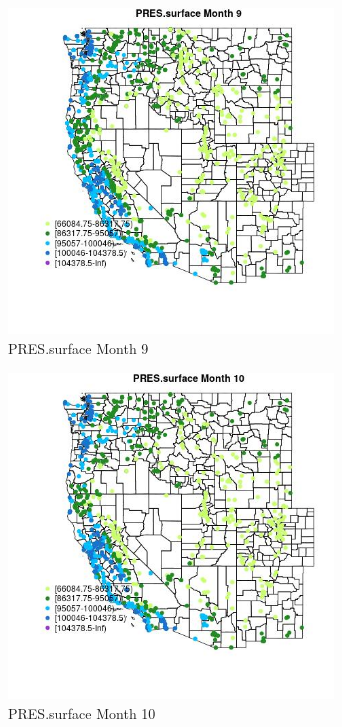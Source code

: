 \begin{figure} 
\centering  
\includegraphics[width=0.77\textwidth]{Code_Outputs/Report_ML_input_PM25_Step4_part_f_de_duplicated_aveswNAs_MapObsMo9PRESsurface.jpg} 
\caption{\label{fig:Report_ML_input_PM25_Step4_part_f_de_duplicated_aveswNAsMapObsMo9PRESsurface}PRES.surface Month 9} 
\end{figure} 
 

\clearpage 

\begin{figure} 
\centering  
\includegraphics[width=0.77\textwidth]{Code_Outputs/Report_ML_input_PM25_Step4_part_f_de_duplicated_aveswNAs_MapObsMo10PRESsurface.jpg} 
\caption{\label{fig:Report_ML_input_PM25_Step4_part_f_de_duplicated_aveswNAsMapObsMo10PRESsurface}PRES.surface Month 10} 
\end{figure} 
 

